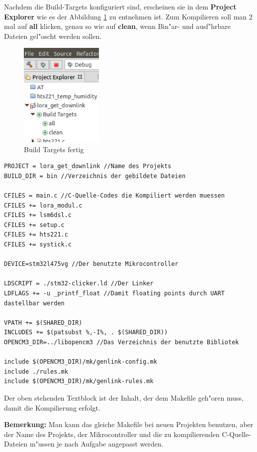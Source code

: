 Nachdem die Build-Targets konfiguriert sind, erscheinen sie in dem 
\textbf{Project Explorer} wie es der Abbildung \ref{fig:build2} zu 
entnehmen ist. Zum Kompilieren soll man 2 mal auf \textbf{all} klicken, 
genau so wie auf \textbf{clean}, wenn Bin"ar- und ausf"hrbare Dateien 
gel"oscht werden sollen. 

\begin{figure}[h]
	\centering
	\includegraphics[width=4cm]{source/images/Build2}
	\caption{Build Targets fertig\label{fig:build2}}
\end{figure}

 \vspace{1cm}
\begin{lstlisting}[frame=single]
PROJECT = lora_get_downlink //Name des Projekts
BUILD_DIR = bin //Verzeichnis der gebildete Dateien

CFILES = main.c //C-Quelle-Codes die Kompiliert werden muessen
CFILES += lora_modul.c
CFILES += lsm6dsl.c
CFILES += setup.c
CFILES += hts221.c
CFILES += systick.c

DEVICE=stm32l475vg //Der benutzte Mikrocontroller

LDSCRIPT = ./stm32-clicker.ld //Der Linker
LDFLAGS += -u _printf_float //Damit floating points durch UART dastellbar werden

VPATH += $(SHARED_DIR)
INCLUDES += $(patsubst %,-I%, . $(SHARED_DIR))
OPENCM3_DIR=../libopencm3 //Das Verzeichnis der benutzte Bibliotek

include $(OPENCM3_DIR)/mk/genlink-config.mk
include ./rules.mk
include $(OPENCM3_DIR)/mk/genlink-rules.mk

\end{lstlisting}
Der oben stehenden Textblock ist der Inhalt, der dem Makefile geh"oren 
muss, damit die Kompilierung erfolgt.
 
\textbf{Bemerkung:} Man kann das gleiche Makefile bei neuen Projekten 
benutzen, aber der Name des Projekts, der Mikrocontroller und die zu 
kompilierenden C-Quelle-Dateien  m"ussen je nach Aufgabe angepasst 
werden.   

